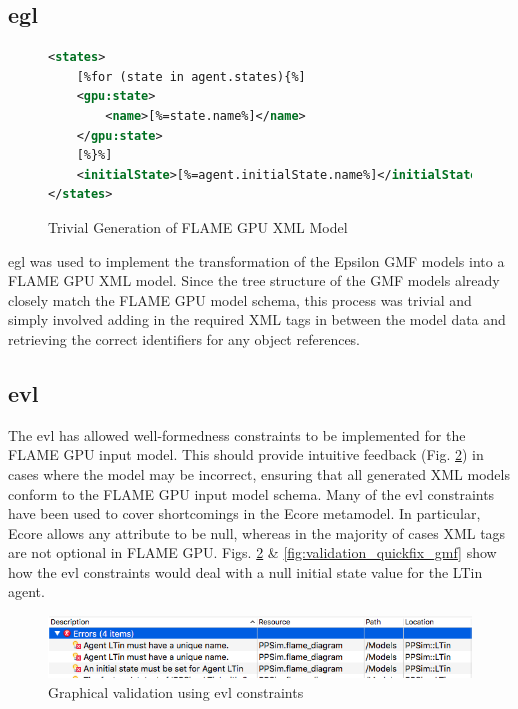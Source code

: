 \documentclass{UoYCSproject}
\begin{document}
\subsection{\acrfull{egl}}
\begin{figure}
\centering
\begin{lstlisting}[language=XML, basicstyle=\tiny]
<states>
    [%for (state in agent.states){%]
    <gpu:state>
        <name>[%=state.name%]</name>
    </gpu:state>
    [%}%]
    <initialState>[%=agent.initialState.name%]</initialState>
</states>
\end{lstlisting}
\caption{Trivial Generation of \gls{FLAME GPU} XML Model}
\label{fig:egl_example}
\end{figure}

\gls{egl} was used to implement the transformation of the Epsilon GMF models into a \gls{FLAME GPU} XML model.
Since the tree structure of the GMF models already closely match the \gls{FLAME GPU} model schema, this process was trivial and simply involved adding in the required XML tags in between the model data and retrieving the correct identifiers for any object references.

\subsection{\acrfull{evl}}
The \gls{evl} has allowed well-formedness constraints to be implemented for the \gls{FLAME GPU} input model.
This should provide intuitive feedback (Fig. \ref{fig:validation_gmf}) in cases where the model may be incorrect, ensuring that all generated XML models conform to the \gls{FLAME GPU} input model schema.
Many of the \gls{evl} constraints have been used to cover shortcomings in the Ecore metamodel.
In particular, Ecore allows any attribute to be null, whereas in the majority of cases XML tags are not optional in \gls{FLAME GPU}.
Figs. \ref{fig:validation_gmf} \& \ref{fig:validation_quickfix_gmf} show how the \gls{evl} constraints would deal with a null initial state value for the \gls{LTin} agent.

\begin{figure}[htp]
\centering
\includegraphics[width=\textwidth]{Appendix/validation_gmf}
\caption{Graphical validation using \gls{evl} constraints}
\label{fig:validation_gmf}
\end{figure}
\end{document}
